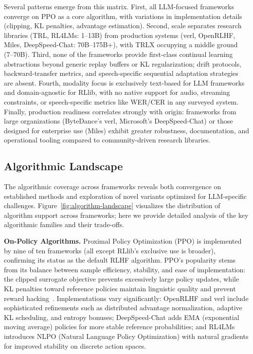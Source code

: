 \documentclass[conference]{IEEEtran}
\begin{document}
Several patterns emerge from this matrix. First, all LLM-focused frameworks converge on PPO as a core algorithm, with variations in implementation details (clipping, KL penalties, advantage estimation). Second, scale separates research libraries (TRL, RL4LMs: 1–13B) from production systems (verl, OpenRLHF, Miles, DeepSpeed-Chat: 70B–175B+), with TRLX occupying a middle ground (7–70B). Third, none of the frameworks provide first-class continual learning abstractions beyond generic replay buffers or KL regularization; drift protocols, backward-transfer metrics, and speech-specific sequential adaptation strategies are absent. Fourth, modality focus is exclusively text-based for LLM frameworks and domain-agnostic for RLlib, with no native support for audio, streaming constraints, or speech-specific metrics like WER/CER in any surveyed system. Finally, production readiness correlates strongly with origin: frameworks from large organizations (ByteDance's verl, Microsoft's DeepSpeed-Chat) or those designed for enterprise use (Miles) exhibit greater robustness, documentation, and operational tooling compared to community-driven research libraries.

\subsection{Algorithmic Landscape}

The algorithmic coverage across frameworks reveals both convergence on established methods and exploration of novel variants optimized for LLM-specific challenges. Figure~\ref{fig:algorithm-landscape} visualizes the distribution of algorithm support across frameworks; here we provide detailed analysis of the key algorithmic families and their trade-offs.

\textbf{On-Policy Algorithms.} Proximal Policy Optimization (PPO) is implemented by nine of ten frameworks (all except RLlib's exclusive use is broader), confirming its status as the default RLHF algorithm. PPO's popularity stems from its balance between sample efficiency, stability, and ease of implementation: the clipped surrogate objective prevents excessively large policy updates, while KL penalties toward reference policies maintain linguistic quality and prevent reward hacking~\cite{ppo-paper, instructgpt-paper}. Implementations vary significantly: OpenRLHF and verl include sophisticated refinements such as distributed advantage normalization, adaptive KL scheduling, and entropy bonuses; DeepSpeed-Chat adds EMA (exponential moving average) policies for more stable reference probabilities; and RL4LMs introduces NLPO (Natural Language Policy Optimization) with natural gradients for improved stability on discrete action spaces.
\end{document}
